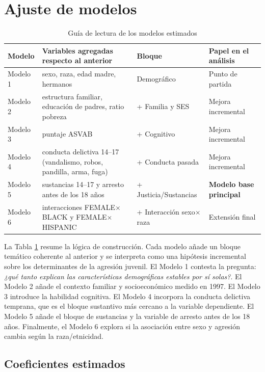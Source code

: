 \documentclass[11pt]{article}
\begin{document}
\section{Ajuste de modelos}

\begin{table}[H]
\centering
\caption{Guía de lectura de los modelos estimados}
\label{tab:model-roadmap}
\small
\begin{tabular}{lp{4.5cm}p{6cm}p{3.2cm}}
\toprule
Modelo & Variables agregadas respecto al anterior & Bloque & Papel en el análisis \\
\midrule
Modelo 1 & sexo, raza, edad madre, hermanos & Demográfico & Punto de partida \\
Modelo 2 & estructura familiar, educación de padres, ratio pobreza & + Familia y SES & Mejora incremental \\
Modelo 3 & puntaje ASVAB & + Cognitivo & Mejora incremental \\
Modelo 4 & conducta delictiva 14--17 (vandalismo, robos, pandilla, arma, fuga) & + Conducta pasada & Mejora incremental \\
Modelo 5 & sustancias 14--17 y arresto antes de los 18 años & + Justicia/Sustancias & \textbf{Modelo base principal} \\
Modelo 6 & interacciones FEMALE$\times$BLACK y FEMALE$\times$HISPANIC & + Interacción sexo$\times$raza & Extensión final \\
\bottomrule
\end{tabular}
\end{table}

La Tabla \ref{tab:model-roadmap} resume la lógica de construcción. Cada modelo añade un bloque temático coherente al anterior y se interpreta como una hipótesis incremental sobre los determinantes de la agresión juvenil. El Modelo 1 contesta la pregunta: \textit{¿qué tanto explican las características demográficas estables por sí solas?}. El Modelo 2 añade el contexto familiar y socioeconómico medido en 1997. El Modelo 3 introduce la habilidad cognitiva. El Modelo 4 incorpora la conducta delictiva temprana, que es el bloque sustantivo más cercano a la variable dependiente. El Modelo 5 añade el bloque de sustancias y la variable de arresto antes de los 18 años. Finalmente, el Modelo 6 explora si la asociación entre sexo y agresión cambia según la raza/etnicidad.

\subsection{Coeficientes estimados}
\end{document}
